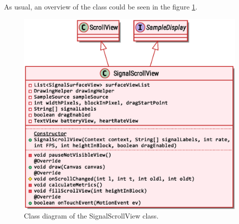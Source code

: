 	As usual, an overview of the class could be seen in the figure \ref{fig9.8}.
\begin{figure}[ht!]
	\centering
	\includegraphics[width=130mm]{figures/ch9/8.eps}
	\caption{Class diagram of the SignalScrollView class.}
	\label{fig9.8}
\end{figure}